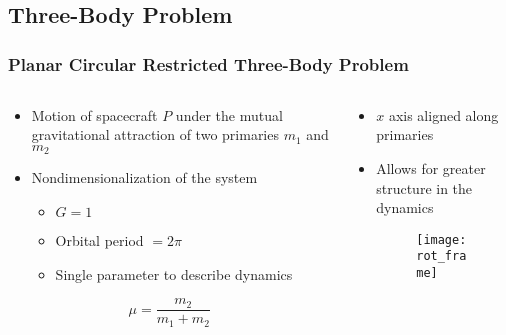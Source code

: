 
\section*{}
\subsection*{Three-Body Problem}  
\begin{frame} %
\frametitle{Planar Circular Restricted Three-Body Problem}
	\begin{columns}[T]
	\begin{column}{0.5\textwidth}
  		\begin{itemize}
  			\item Motion of spacecraft \( P\) under the mutual gravitational attraction of two primaries \( m_1 \) and \( m_2 \)
			\item Nondimensionalization of the system
			\begin{itemize}
				\item \(G = 1\)
				\item Orbital period \( = 2\pi\)
				\item Single parameter to describe dynamics
			\end{itemize}	
					
 		\end{itemize}
 	\begin{equation*}
		\mu = \frac{m_2}{m_1+m_2}
		\label{eq:mass_param}
	\end{equation*}
	\end{column}
	\begin{column}[T]{0.5\textwidth}
		\begin{itemize}
			\item  \(x\) axis aligned along primaries
			\item Allows for greater structure in the dynamics
		\begin{figure}[htbp]%
        	\texttt{[image: rot\_frame]}%
		\end{figure}%
		\end{itemize}
	\end{column}
	\end{columns}
\end{frame}   %

